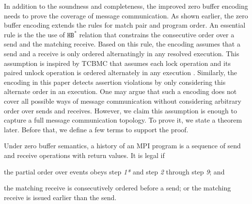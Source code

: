 
In addition to the soundness and completeness, the improved zero buffer encoding needs to prove the coverage of message communication. As shown earlier, the zero buffer encoding extends the rules for match pair and program order. An essential rule is the the use of $\mathtt{HB^*}$ relation that constrains the consecutive order over a send and the matching receive. Based on this rule, the encoding assumes that a send and a receive is only ordered alternatingly in any resolved execution. This assumption is inspired by TCBMC that assumes each lock operation and its paired unlock operation is ordered alternately in any execution \cite{DBLP:conf/cav/RabinovitzG05}. Similarly, the encoding in this paper detects assertion violations by only considering this alternate order in an execution. One may argue that such a encoding does not cover all possible ways of message communication without considering arbitrary order over sends and receives. However, we claim this assumption is enough to capture a full message communication topology. To prove it, we state a theorem later.  Before that, we define a few terms to support the proof.

\begin{definition}\label{def:legal}
Under zero buffer semantics, a history of an MPI program is a sequence of send and receive operations with return values. It is legal if
\begin{compactenum}
\item the partial order over events obeys step \textit{1*} and step \textit{2} through step \textit{9}; and 
\item the matching receive is consecutively ordered before a send; or the matching receive is issued earlier than the send.
\end{compactenum}
\end{definition}

